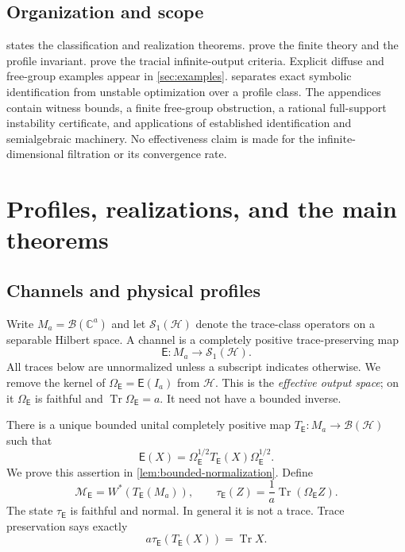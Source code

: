 \documentclass[11pt,reqno]{amsart}
\theoremstyle{definition}
\theoremstyle{remark}
\numberwithin{equation}{section}
\DeclareMathOperator{\Tr}{Tr}
\newcommand{\M}{\mathcal M}
\newcommand{\HH}{\mathcal H}
\newcommand{\Sone}{\mathcal S_1}
\newcommand{\B}{\mathcal B}
\newcommand{\E}{\mathsf E}
\begin{document}
\subsection{Organization and scope}

 states the classification and realization theorems.  prove the finite theory and the profile invariant.  prove the tracial infinite-output criteria. Explicit diffuse and free-group examples appear in \cref{sec:examples}.  separates exact symbolic identification from unstable optimization over a profile class. The appendices contain witness bounds, a finite free-group obstruction, a rational full-support instability certificate, and applications of established identification and semialgebraic machinery. No effectiveness claim is made for the infinite-dimensional filtration or its convergence rate.


\clearpage

\section{Profiles, realizations, and the main theorems}\label{sec:framework}

\subsection{Channels and physical profiles}

Write $M_a=\B(\mathbb C^a)$ and let $\Sone(\HH)$ denote the trace-class operators on a separable Hilbert space. A channel is a completely positive trace-preserving map
\[
 \E:M_a\longrightarrow\Sone(\HH).
\]
All traces below are unnormalized unless a subscript indicates otherwise. We remove the kernel of $\Omega_\E=\E(I_a)$ from $\HH$. This is the \emph{effective output space}; on it $\Omega_\E$ is faithful and $\Tr\Omega_\E=a$. It need not have a bounded inverse.

There is a unique bounded unital completely positive map $T_\E:M_a\to\B(\HH)$ such that
\begin{equation}\label{eq:normalization}
 \E(X)=\Omega_\E^{1/2}T_\E(X)\Omega_\E^{1/2}.
\end{equation}
We prove this assertion in \cref{lem:bounded-normalization}. Define
\begin{equation}\label{eq:invariant}
 \M_\E=W^*(T_\E(M_a)),\qquad
 \tau_\E(Z)=\frac1a\Tr(\Omega_\E Z).
\end{equation}
The state $\tau_\E$ is faithful and normal. In general it is not a trace. Trace preservation says exactly
\begin{equation}\label{eq:trace-label}
 a\tau_\E(T_\E(X))=\Tr X.
\end{equation}
\end{document}
